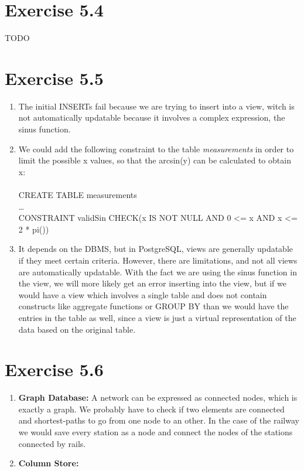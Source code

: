 \documentclass{article} %
\newcommand{\homeworkNumber}{5}
\begin{document}
\section*{Exercise \homeworkNumber.4}

TODO

\section*{Exercise \homeworkNumber.5}

\begin{enumerate}[(1)]
\item The initial INSERTs fail because we are trying to insert into a view, witch is not automatically updatable because it involves a complex expression, the sinus function.

\item We could add the following constraint to the table \textit{measurements} in order to limit the possible x values, so that the arcsin(y) can be calculated to obtain x:\\\\
CREATE TABLE measurements\\
\dots\\
CONSTRAINT validSin CHECK(x IS NOT NULL AND 0 <= x AND x <= 2 * pi())

\item It depends on the DBMS, but in PostgreSQL, views are generally updatable if they meet certain criteria. However, there are limitations, and not all views are automatically updatable. With the fact we are using the sinus function in the view, we will more likely get an error inserting into the view, but if we would have a view which involves a single table and does not contain constructs like aggregate functions or GROUP BY than we would have the entries in the table as well, since a view is just a virtual representation of the data based on the original table.
\end{enumerate}

\section*{Exercise \homeworkNumber.6}

\begin{enumerate}[(1)]
\item \textbf{Graph Database:} A network can be expressed as connected nodes, which is exactly a graph. We probably have to check if two elements are connected and shortest-paths to go from one node to an other. In the case of the railway we would save every station as a node and connect the nodes of the stations connected by rails.

\item \textbf{Column Store:}
\end{enumerate}
\end{document}

